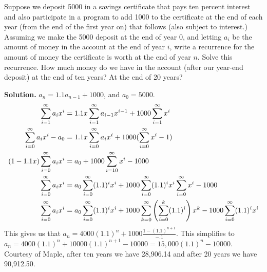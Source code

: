 \documentclass{book}
\begin{document}
\setcounter{project}{259}
\addtocounter{project}{-1}
\begin{activity}[]\label{activity-252}
\hypertarget{p-1383}{}%
Suppose we deposit \textdollar{}5000 in a savings certificate that pays ten percent interest and also participate in a program to add \textdollar{}1000 to the certificate at the end of each year (from the end of the first year on) that follows (also subject to interest.) Assuming we make the \textdollar{}5000 deposit at the end of year 0, and letting \(a_i\) be the amount of money in the account at the end of year \(i\), write a recurrence for the amount of money the certificate is worth at the end of year \(n\). Solve this recurrence. How much money do we have in the account (after our year-end deposit) at the end of ten years?  At the end of 20 years?%
\par\smallskip%
\noindent\textbf{Solution.}\hypertarget{solution-181}{}\quad%
\hypertarget{p-1384}{}%
\(a_n=1.1a_{n-1}+1000\), and \(a_0=5000\).%
\begin{align*}
\sum_{i=1}^\infty
a_ix^i &= 1.1x\sum_{i=1}^\infty a_{i-1}x^{i-1} + 1000\sum_{i=1}^\infty x^i\\
\sum_{i=0}^\infty a_ix^i -a_0 &=
1.1x\sum_{i=0}^\infty a_ix^i +1000(\sum_{i=0}^\infty x^i-1)\\
(1-1.1x)\sum_{i=0}^\infty a_ix^i  &=  a_0 +1000\sum_{i=10}^\infty x^i-1000\\
\sum_{i=0}^\infty a_i x^i &=  a_0\sum_{i=0}^\infty (1.1)^ix^i
+1000\sum_{i=0}^\infty (1.1)^ix^i\sum_{i=0}^\infty x^i -1000\\
\sum_{i=0}^\infty a_i x^i &=  a_0\sum_{i=0}^\infty (1.1)^ix^i
+1000\sum_{k=0}^\infty \left(\sum_{i=0}^k(1.1)^i\right)x^k
- 1000\sum_{i=0}^\infty (1.1)^ix^i
\end{align*}
This gives us that \(a_n= 4000(1.1)^n +1000 \frac{1-(1.1)^{n+1}}{-.1}\). This simplifies to \(a_n= 4000(1.1)^n+10000(1.1)^{n+1}-10000 = 15,000(1.1)^n-10000\). Courtesy of Maple, after ten years we have \textdollar{}28,906.14 and after 20 years we have \textdollar{}90,912.50.%
\end{activity}
\end{document}
